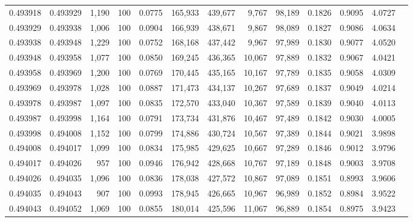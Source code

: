 \begin{tabular}{rrrrrrrrrrrrr}
0.493918 & 0.493929 & 1,190 & 100 &                                     0.0775 & 165,933 & 439,677 &   9,767 &  98,189 & 0.1826 & 0.9095 & 4.0727 \\
0.493929 & 0.493938 & 1,006 & 100 &                                     0.0904 & 166,939 & 438,671 &   9,867 &  98,089 & 0.1827 & 0.9086 & 4.0634 \\
0.493938 & 0.493948 & 1,229 & 100 &                                     0.0752 & 168,168 & 437,442 &   9,967 &  97,989 & 0.1830 & 0.9077 & 4.0520 \\
0.493948 & 0.493958 & 1,077 & 100 &                                     0.0850 & 169,245 & 436,365 &  10,067 &  97,889 & 0.1832 & 0.9067 & 4.0421 \\
0.493958 & 0.493969 & 1,200 & 100 &                                     0.0769 & 170,445 & 435,165 &  10,167 &  97,789 & 0.1835 & 0.9058 & 4.0309 \\
0.493969 & 0.493978 & 1,028 & 100 &                                     0.0887 & 171,473 & 434,137 &  10,267 &  97,689 & 0.1837 & 0.9049 & 4.0214 \\
0.493978 & 0.493987 & 1,097 & 100 &                                     0.0835 & 172,570 & 433,040 &  10,367 &  97,589 & 0.1839 & 0.9040 & 4.0113 \\
0.493987 & 0.493998 & 1,164 & 100 &                                     0.0791 & 173,734 & 431,876 &  10,467 &  97,489 & 0.1842 & 0.9030 & 4.0005 \\
0.493998 & 0.494008 & 1,152 & 100 &                                     0.0799 & 174,886 & 430,724 &  10,567 &  97,389 & 0.1844 & 0.9021 & 3.9898 \\
0.494008 & 0.494017 & 1,099 & 100 &                                     0.0834 & 175,985 & 429,625 &  10,667 &  97,289 & 0.1846 & 0.9012 & 3.9796 \\
0.494017 & 0.494026 &   957 & 100 &                                     0.0946 & 176,942 & 428,668 &  10,767 &  97,189 & 0.1848 & 0.9003 & 3.9708 \\
0.494026 & 0.494035 & 1,096 & 100 &                                     0.0836 & 178,038 & 427,572 &  10,867 &  97,089 & 0.1851 & 0.8993 & 3.9606 \\
0.494035 & 0.494043 &   907 & 100 &                                     0.0993 & 178,945 & 426,665 &  10,967 &  96,989 & 0.1852 & 0.8984 & 3.9522 \\
0.494043 & 0.494052 & 1,069 & 100 &                                     0.0855 & 180,014 & 425,596 &  11,067 &  96,889 & 0.1854 & 0.8975 & 3.9423 \\

\end{tabular}
